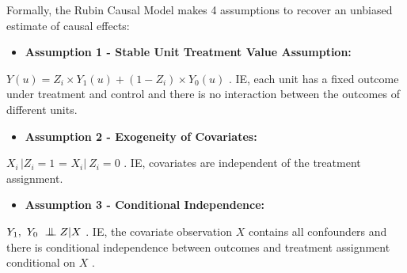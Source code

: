 \documentclass[../main.tex]{subfiles}
\begin{document}
\vspace{\baselineskip}
Formally, the Rubin Causal Model makes 4 assumptions to recover an unbiased estimate of causal effects:\par


\vspace{\baselineskip}
\begin{itemize}
	\item \textbf{Assumption 1 - Stable Unit Treatment Value Assumption:}
\end{itemize}\par

\begin{adjustwidth}{0.5in}{0.0in}
 \( Y \left( u \right)  =Z_{i} \times Y_{1} \left( u \right) + \left( 1-Z_{i} \right)  \times Y_{0} \left( u \right)  \) . IE, each unit has a fixed outcome under treatment and control and there is no interaction between the outcomes of different units.\par

\end{adjustwidth}


\vspace{\baselineskip}
\begin{itemize}
	\item \textbf{Assumption 2 - Exogeneity of Covariates:}
\end{itemize}\par

\begin{adjustwidth}{0.5in}{0.0in}
\( X_{i~}  \vert  Z_{i}=1 \) \textbf{ }=  \( X_{i}  \vert ~Z_{i}=0 \) . IE, covariates are independent of the treatment assignment.\par
\end{adjustwidth}

\vspace{\baselineskip}
\begin{itemize}
	\item \textbf{Assumption 3 - Conditional Independence:}
\end{itemize}\par

\begin{adjustwidth}{0.5in}{0.0in}
 \( Y_{1},~Y_{0} ~ \bigCI Z  \vert  X \) . IE, the covariate observation  \( X \) contains all confounders and there is conditional independence between outcomes and treatment assignment conditional on  \( X \) .\par

\end{adjustwidth}
\end{document}
